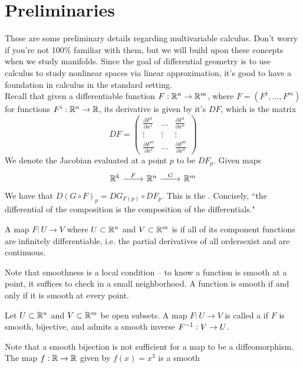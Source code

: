 \setcounter{section}{-1}
%
\section{Preliminaries}
%
These are some preliminary details regarding multivariable calculus. Don't
worry if you're not 100\% familiar with them, but we will build upon these
concepts when we study manifolds. Since the goal of differential geometry
is to use calculus to study nonlinear spaces via linear approximation,
it's good to have a foundation in calculus in the standard setting.\\

Recall that given a differentiable function $F: \mathbb{R}^n \to \mathbb{R}^m$, where
$F = (F^1, \ldots, F^m)$ for functions $F^i : \mathbb{R}^n \to \mathbb{R}$, its derivative
is given by it's  $DF$, which is the matrix
$$DF = \begin{pmatrix}
\frac{\partial F^1}{\partial x^1} &
\ldots & \frac{\partial F^1}{\partial x^n} \\
\vdots & \vdots & \vdots \\
\frac{\partial F^m}{\partial x^1} &
\ldots & \frac{\partial F^m}{\partial x^n}
\end{pmatrix} $$
We denote the Jacobian evaluated at a point $p$ to be $DF_p$. Given maps
$$\begin{tikzcd}
\R^k \ar[r,"F"] & \R^n \ar[r, "G"] & \R^m
\end{tikzcd}$$
We have that $D(G \circ F)_p = DG_{F(p)} \circ DF_p$. This is the
. Concisely, ``the differential of the
composition is the composition of the differentials."
%
\begin{defn}
	A map $F : U \to V$ where $U \subset \mathbb{R}^n$ and $V \subset \mathbb{R}^m$ is
	 if all of its component functions are infinitely
	differentiable, i.e. the partial derivatives of all ordersexist and are
	continuous.
\end{defn}
%
Note that smoothness is a local condition -- to know a function is smooth
at a point, it suffices to check in a small neighborhood. A function is
smooth if and only if it is smooth at every point.
%
\begin{defn}
	Let $U \subset \mathbb{R}^n$ and $V \subset \mathbb{R}^m$ be open subsets. A map
	$F : U \to V$ is called a  if $F$ is smooth,
	bijective, and admits a smooth inverse $F^{-1} : V \to U$.
\end{defn}
%
Note that a smooth bijection is not sufficient for a map to be a
diffeomorphism. The map $f : \mathbb{R} \to \mathbb{R}$ given by $f(x) = x^3$ is a smooth
